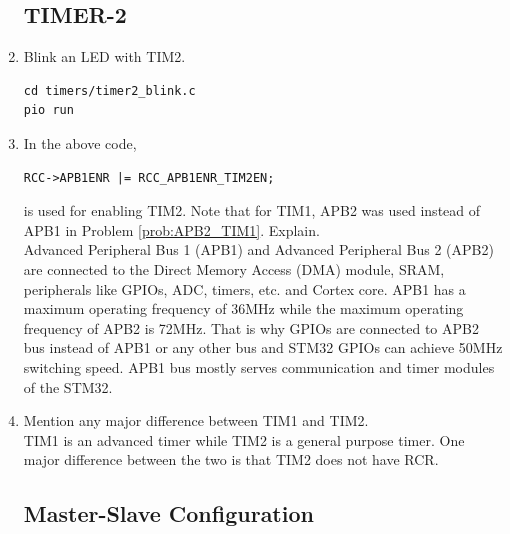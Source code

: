\documentclass[journal,12pt,twocolumn]{IEEEtran}
\renewcommand\thesection{\arabic{section}}
\renewcommand\thesubsection{\thesection.\arabic{subsection}}
\begin{document}
\begin{enumerate}[label=\thesubsection.\arabic*.,ref=\thesubsection.\theenumi]
\subsection{TIMER-2}
\item Blink an LED with TIM2.
\\
\solution 
\begin{lstlisting}
cd timers/timer2_blink.c
pio run	
\end{lstlisting}
\item In the above code, 
\begin{lstlisting}
RCC->APB1ENR |= RCC_APB1ENR_TIM2EN;
\end{lstlisting}
is used for enabling TIM2. Note that for TIM1, APB2 was used instead of APB1 in Problem \ref{prob:APB2_TIM1}.  Explain.
\\
\solution Advanced Peripheral Bus 1 (APB1) and Advanced Peripheral Bus 2 (APB2) are connected to the Direct Memory Access (DMA) module, SRAM, peripherals like GPIOs, ADC, timers, etc. and Cortex core. APB1 has a maximum operating frequency of 36MHz while the maximum operating frequency of APB2  is 72MHz. That is why GPIOs are connected to APB2 bus instead of APB1 or any other bus and STM32 GPIOs can achieve 50MHz switching speed. APB1 bus mostly serves communication and timer modules of the STM32. 
\item Mention any major difference between TIM1 and TIM2.
\\
\solution TIM1 is an advanced timer while TIM2 is a general purpose timer.  One major difference between the two is that TIM2 does not have RCR.
\subsection{Master-Slave Configuration}

\end{enumerate}
\end{document}
